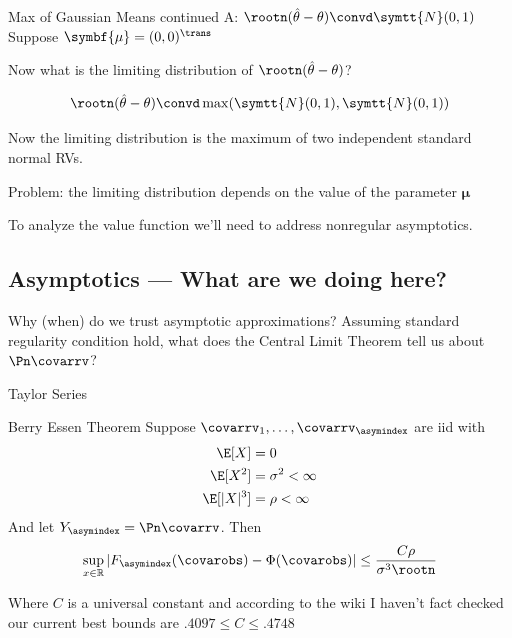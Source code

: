 \documentclass[aspectratio=169, professionalfonts]{beamer}
\begin{document}
\begin{frame}{Max of Gaussian Means continued}
	A: $\rootn (\hat{\theta} - \theta) \convd \symtt{N}(0, 1)$
	\pause
	\vfill
	Suppose $\symbf{\mu} = (0 , 0)^{\trans}$

	Now what is the limiting distribution of $ \rootn (\hat{\theta} - \theta)$?

	\vfill \pause

	$$\rootn (\hat{\theta} - \theta) \convd \max(\symtt{N}(0, 1), \symtt{N}(0, 1))$$

	Now the limiting distribution is the maximum of two independent standard
	normal RVs.

	\vfill \pause

	Problem: the limiting distribution depends on the value of the parameter
	$\symbf{\mu}$

	\vfill

	To analyze the value function we'll need to address nonregular asymptotics.
\end{frame}


\subsection{Asymptotics --- What are we doing here?}
\begin{frame}{Why (when) do we trust asymptotic approximations?}
	Assuming standard regularity condition hold, what does the Central Limit
	Theorem tell us about $\Pn \covarrv$?

	Taylor Series
\end{frame}

\begin{frame}{Berry Essen Theorem}
	Suppose $\covarrv_1, \ldots, \covarrv_{\asymindex}$ are iid with
	\begin{align*}
		\E[X]     & = 0                 \\
		\E[X^2]   & = \sigma^2 < \infty \\
		\E[|X|^3] & = \rho < \infty
	\end{align*}
	And let $Y_{\asymindex} = \Pn \covarrv$. Then
	\vfill
	\begin{equation}
		\sup_{x \in \mathbb{R}}|F_{\asymindex}(\covarobs) - \Phi(\covarobs)| \leq \frac{C
			\rho}{\sigma^{3} \rootn }
	\end{equation}

	Where $C$ is a universal constant and according to the wiki I haven't fact
	checked our current best bounds are $.4097 \leq C \leq .4748$
	\vfill
\end{frame}
\end{document}

